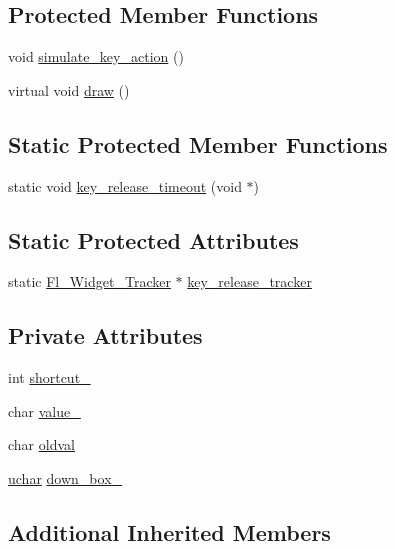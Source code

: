 \subsection*{Protected Member Functions}
\begin{DoxyCompactItemize}
\item 
void \hyperlink{class_fl___button_a9c09299acdca97e128d6cf2e8fe0a469}{simulate\+\_\+key\+\_\+action} ()
\item 
virtual void \hyperlink{class_fl___button_a98687e86bf07a47a8be8325250e2036b}{draw} ()
\end{DoxyCompactItemize}
\subsection*{Static Protected Member Functions}
\begin{DoxyCompactItemize}
\item 
static void \hyperlink{class_fl___button_a63a541cac3d2eccadfc65e81a5117c40}{key\+\_\+release\+\_\+timeout} (void $\ast$)
\end{DoxyCompactItemize}
\subsection*{Static Protected Attributes}
\begin{DoxyCompactItemize}
\item 
static \hyperlink{class_fl___widget___tracker}{Fl\+\_\+\+Widget\+\_\+\+Tracker} $\ast$ \hyperlink{class_fl___button_a35488f931e2eb86ee2edf93f3757e387}{key\+\_\+release\+\_\+tracker}
\end{DoxyCompactItemize}
\subsection*{Private Attributes}
\begin{DoxyCompactItemize}
\item 
int \hyperlink{class_fl___button_a037348dac96f02a7b3c0789f48c24e89}{shortcut\+\_\+}
\item 
char \hyperlink{class_fl___button_a040cbe57382fdffce471b97a1a059929}{value\+\_\+}
\item 
char \hyperlink{class_fl___button_a5dce2dba13e7333a048b7c15944580fa}{oldval}
\item 
\hyperlink{fl__types_8h_a65f85814a8290f9797005d3b28e7e5fc}{uchar} \hyperlink{class_fl___button_a1de946775768588ee2ef66d0da2e570f}{down\+\_\+box\+\_\+}
\end{DoxyCompactItemize}
\subsection*{Additional Inherited Members}


